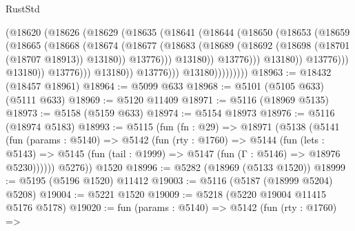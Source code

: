 \begin{lexlean}{RustStd}
\begin{coremodule}
                                      (@18620
                                        (@18626
                                          (@18629
                                            (@18635
                                              (@18641
                                                (@18644
                                                  (@18650
                                                    (@18653
                                                      (@18659
                                                        (@18665
                                                          (@18668
                                                            (@18674
                                                              (@18677
                                                                (@18683
                                                                  (@18689
                                                                    (@18692
                                                                      (@18698
                                                                        (@18701 (@18707 @18913))
                                                                        @13180))
                                                                    @13776)))
                                                              @13180))
                                                          @13776)))
                                                    @13180))
                                                @13776)))
                                          @13180))
                                      @13776)))
                                @13180))
                            @13776)))
                      @13180)))))))))
@18963 := @18432 (@18457 @18961)
@18964 := @5099 @633
@18968 := @5101 (@5105 @633) (@5111 @633)
@18969 := @5120 @11409
@18971 := @5116 (@18969 @5135)
@18973 := @5158 (@5159 @633)
@18974 := @5154 @18973
@18976 := @5116 (@18974 @5183)
@18993 := @5115
    (fun (fn : @29) =>
    @18971
      (@5138
        (@5141
          (fun (params : @5140) =>
          @5142
            (fun (rty : @1760) =>
            @5144
              (fun (lets : @5143) =>
              @5145 (fun (tail : @1999) => @5147 (fun (Γ : @5146) => @18976 @5230))))))
        @5276))
    @1520
@18996 := @5282 (@18969 (@5133 @1520))
@18999 := @5195 (@5196 @1520) @11412
@19003 := @5116 (@5187 (@18999 @5204) @5208)
@19004 := @5221 @1520
@19009 := @5218 (@5220 @19004 @11415 @5176 @5178)
@19020 := fun (params : @5140) =>
  @5142
    (fun (rty : @1760) =>

\end{coremodule}
\end{lexlean}
